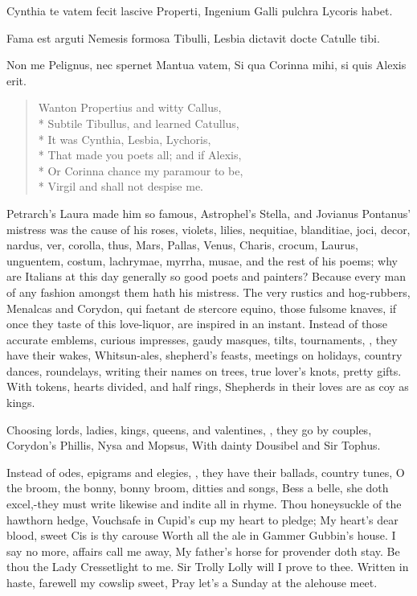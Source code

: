 Cynthia te vatem fecit lascive Properti,
Ingenium Galli pulchra Lycoris habet.

Fama est arguti Nemesis formosa Tibulli,
Lesbia dictavit docte Catulle tibi.

Non me Pelignus, nec spernet Mantua vatem,
Si qua Corinna mihi, si quis Alexis erit.


\begin{verse}
Wanton Propertius and witty Callus,\\*
Subtile Tibullus, and learned Catullus,\\*
It was Cynthia, Lesbia, Lychoris,\\*
That made you poets all; and if Alexis,\\*
Or Corinna chance my paramour to be,\\*
Virgil and \Ovid shall not despise me.
\end{verse}


Petrarch's Laura made him so famous, Astrophel's Stella, and Jovianus
Pontanus' mistress was the cause of his roses, violets, lilies,
nequitiae, blanditiae, joci, decor, nardus, ver, corolla, thus, Mars,
Pallas, Venus, Charis, crocum, Laurus, unguentem, costum, lachrymae,
myrrha, musae, \etc{} and the rest of his poems; why are Italians at this
day generally so good poets and painters? Because every man of any
fashion amongst them hath his mistress. The very rustics and
hog-rubbers, Menalcas and Corydon, qui faetant de stercore equino,
those fulsome knaves, if once they taste of this love-liquor, are
inspired in an instant. Instead of those accurate emblems, curious
impresses, gaudy masques, tilts, tournaments, \etc{}, they have their
wakes, Whitsun-ales, shepherd's feasts, meetings on holidays, country
dances, roundelays, writing their names on trees, true lover's
knots, pretty gifts.
With tokens, hearts divided, and half rings,
Shepherds in their loves are as coy as kings.

Choosing lords, ladies, kings, queens, and valentines, \etc{}, they go by
couples,
Corydon's Phillis, Nysa and Mopsus,
With dainty Dousibel and Sir Tophus.

Instead of odes, epigrams and elegies, \etc{}, they have their ballads,
country tunes, O the broom, the bonny, bonny broom, ditties and songs,
Bess a belle, she doth excel,-they must write likewise and indite all
in rhyme.
Thou honeysuckle of the hawthorn hedge,
Vouchsafe in Cupid's cup my heart to pledge;
My heart's dear blood, sweet Cis is thy carouse
Worth all the ale in Gammer Gubbin's house.
I say no more, affairs call me away,
My father's horse for provender doth stay.
Be thou the Lady Cressetlight to me.
Sir Trolly Lolly will I prove to thee.
Written in haste, farewell my cowslip sweet,
Pray let's a Sunday at the alehouse meet.

